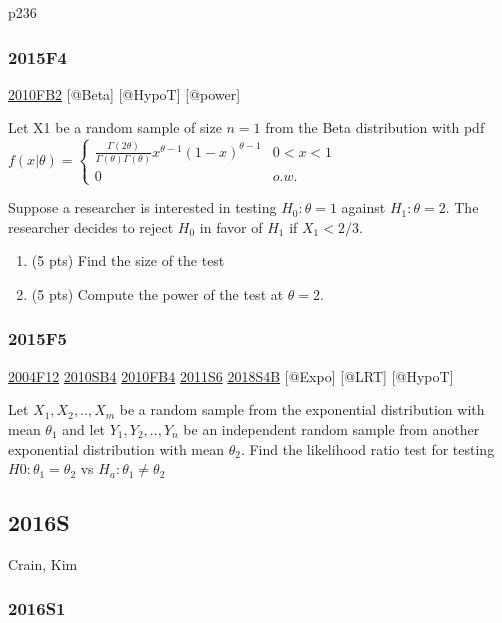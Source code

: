 \documentclass[6pt,Portrait]{article}
\begin{document}
p236

\hypertarget{f4-5}{%
\subsubsection{2015F4}\label{f4-5}}

\protect\hyperlink{fb2-1}{2010FB2} {[}@Beta{]} {[}@HypoT{]} {[}@power{]}

Let X1 be a random sample of size \(n=1\) from the Beta distribution
with pdf
\(f(x|\theta)=\begin{cases}\frac{\Gamma(2\theta)}{\Gamma(\theta)\Gamma(\theta)}x^{\theta-1}(1-x)^{\theta-1}&0<x<1\\0&o.w.\end{cases}\)

Suppose a researcher is interested in testing \(H_0:\theta=1\) against
\(H_1:\theta=2\). The researcher decides to reject \(H_0\) in favor of
\(H_1\) if \(X_1<2/3\).

\begin{enumerate}
\def\labelenumi{(\alph{enumi})}
\item
  (5 pts) Find the size of the test
\item
  (5 pts) Compute the power of the test at \(\theta=2\).
\end{enumerate}

\hypertarget{f5-5}{%
\subsubsection{2015F5}\label{f5-5}}

\protect\hyperlink{f12}{2004F12} \protect\hyperlink{sb4}{2010SB4}
\protect\hyperlink{fb4-1}{2010FB4} \protect\hyperlink{s6-2}{2011S6}
\protect\hyperlink{s4b-2}{2018S4B} {[}@Expo{]} {[}@LRT{]} {[}@HypoT{]}

Let \(X_1,X_2,..,X_{m}\) be a random sample from the exponential
distribution with mean \(\theta_1\) and let \(Y_1,Y_2,..,Y_{n}\) be an
independent random sample from another exponential distribution with
mean \(\theta_2\). Find the likelihood ratio test for testing
\(H0:\theta_1=\theta_2\) vs \(H_a:\theta_1\neq\theta_2\)

\hypertarget{s-9}{%
\subsection{2016S}\label{s-9}}

Crain, Kim

\hypertarget{s1-4}{%
\subsubsection{2016S1}\label{s1-4}}
\end{document}
